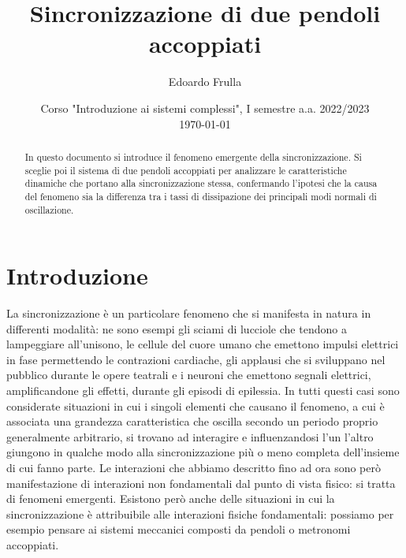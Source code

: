 \documentclass[11pt, a4paper, twoside]{article}
\author{Edoardo Frulla}
\date{Corso "Introduzione ai sistemi complessi", I semestre a.a. 2022/2023 \\ \vspace{0.3cm} \today}
\title{Sincronizzazione di due pendoli accoppiati}
\begin{document}
\maketitle
    \begin{abstract}
        In questo documento si introduce il fenomeno emergente della sincronizzazione.
        Si sceglie poi il sistema di due pendoli accoppiati per analizzare le caratteristiche
        dinamiche che portano alla sincronizzazione stessa, confermando l'ipotesi che
        la causa del fenomeno sia la differenza tra i tassi di dissipazione dei principali
        modi normali di oscillazione.
    \end{abstract}

\section{Introduzione}
La sincronizzazione è un particolare fenomeno che si manifesta in natura in differenti modalità: ne sono esempi gli sciami di lucciole che tendono a lampeggiare all'unisono, le cellule del cuore umano che emettono impulsi elettrici in fase permettendo le contrazioni cardiache, gli applausi che si sviluppano nel pubblico durante le opere teatrali e i neuroni che emettono segnali elettrici, amplificandone gli effetti, durante gli episodi di epilessia.
In tutti questi casi sono considerate situazioni in cui i singoli elementi che causano il fenomeno, a cui è associata una grandezza caratteristica che oscilla secondo un periodo proprio generalmente arbitrario, si trovano ad interagire e influenzandosi l'un l'altro giungono in qualche modo alla sincronizzazione più o meno completa dell'insieme di cui fanno parte.
Le interazioni che abbiamo descritto fino ad ora sono però manifestazione di interazioni non fondamentali dal punto di vista fisico: si tratta di fenomeni emergenti. 
Esistono però anche delle situazioni in cui la sincronizzazione è attribuibile alle interazioni fisiche fondamentali: possiamo per esempio pensare ai sistemi meccanici composti da pendoli o metronomi accoppiati.
\end{document}

